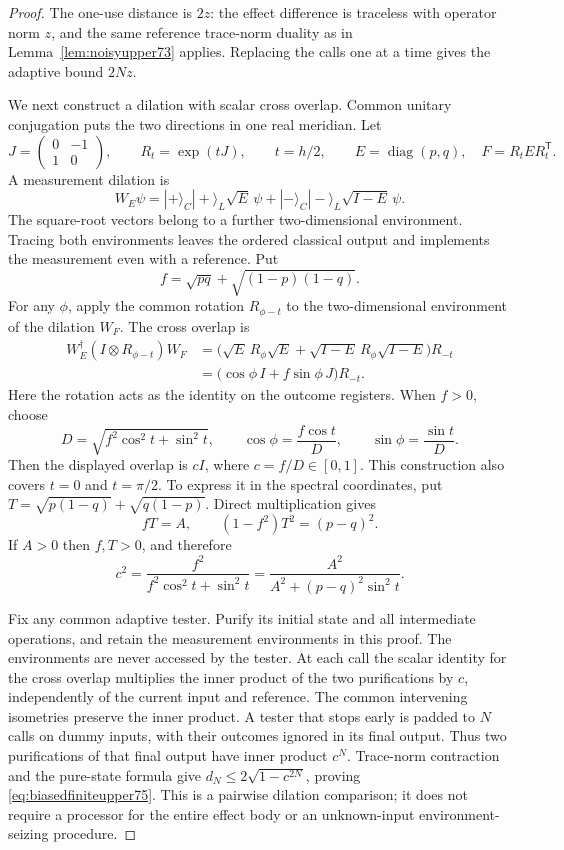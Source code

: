 \begin{proof}
The one-use distance is $2z$: the effect difference is traceless
with operator norm $z$, and the same reference trace-norm duality
as in Lemma~\ref{lem:noisyupper73} applies.  Replacing the calls one
at a time gives the adaptive bound $2Nz$.

We next construct a dilation with scalar cross overlap.  Common
unitary conjugation puts the two directions in one real meridian.
Let
\[
 J=\begin{pmatrix}0&-1\\1&0\end{pmatrix},\qquad
 R_t=\exp(tJ),\qquad t=h/2,\qquad
 E=\operatorname{diag}(p,q),\quad F=R_tER_t^{\mathsf T}.
\]
A measurement dilation is
\[
 W_E\psi=|+\rangle_C|+\rangle_L\sqrt E\,\psi
            +|-\rangle_C|-\rangle_L\sqrt{I-E}\,\psi.
\]
The square-root vectors belong to a further two-dimensional
environment.  Tracing both environments leaves the ordered
classical output and implements the measurement even with a
reference.  Put
\[
 f=\sqrt{pq}+\sqrt{(1-p)(1-q)}.
\]
For any $\phi$, apply the common rotation $R_{\phi-t}$ to the
two-dimensional environment of the dilation $W_F$.  The cross
overlap is
\begin{align*}
 W_E^\dagger(I\otimes R_{\phi-t})W_F
 &=\bigl(\sqrt E\,R_\phi\sqrt E
        +\sqrt{I-E}\,R_\phi\sqrt{I-E}\bigr)R_{-t}\\
 &=\bigl(\cos\phi\,I+f\sin\phi\,J\bigr)R_{-t}.
\end{align*}
Here the rotation acts as the identity on the outcome registers.
When $f>0$, choose
\[
 D=\sqrt{f^2\cos^2t+\sin^2t},\qquad
 \cos\phi=\frac{f\cos t}{D},\qquad
 \sin\phi=\frac{\sin t}{D}.
\]
Then the displayed overlap is $cI$, where $c=f/D\in[0,1]$.
This construction also covers $t=0$ and $t=\pi/2$.
To express it in the spectral coordinates, put
$T=\sqrt{p(1-q)}+\sqrt{q(1-p)}$.  Direct multiplication gives
\[
 fT=A,\qquad (1-f^2)T^2=(p-q)^2.
\]
If $A>0$ then $f,T>0$, and therefore
\begin{equation}\label{eq:scalaroverlap75}
 c^2=\frac{f^2}{f^2\cos^2t+\sin^2t}
          =\frac{A^2}{A^2+(p-q)^2\sin^2t}.
\end{equation}

Fix any common adaptive tester.  Purify its initial state and all
intermediate operations, and retain the measurement environments in
this proof.  The environments are never accessed by the tester.
At each call the scalar identity for the cross overlap multiplies
the inner product of the two purifications by $c$, independently of
the current input and reference.  The common intervening isometries
preserve the inner product.  A tester that stops early is padded to
$N$ calls on dummy inputs, with their outcomes ignored in its final
output.  Thus two purifications of that final output have inner
product $c^N$.  Trace-norm contraction and the pure-state formula
give $d_N\le2\sqrt{1-c^{2N}}$, proving
\eqref{eq:biasedfiniteupper75}.  This is a pairwise dilation
comparison; it does not require a processor for the entire effect
body or an unknown-input environment-seizing procedure.


\end{proof}
